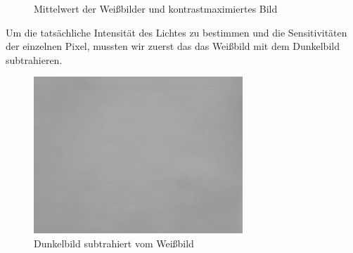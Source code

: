 \documentclass[12pt, oneside, a4paper, \docLanguage]{report}
\begin{document}
\begin{figure}[hbt!]
	\centering
	\hfill
	\caption{Mittelwert der Weißbilder und kontrastmaximiertes Bild}
\end{figure}

Um die tatsächliche Intensität des Lichtes zu bestimmen und die Sensitivitäten der einzelnen Pixel, mussten wir zuerst das das Weißbild mit dem Dunkelbild subtrahieren.

\begin{figure}[hbt!]
	\centering\small
	\includegraphics[width=0.7\textwidth]{../data/whiteminusblack.png}
	\caption{Dunkelbild subtrahiert vom Weißbild}
	\label{fig:Dunkelbild subtrahiert vom Weißbild}
\end{figure}
\end{document}
